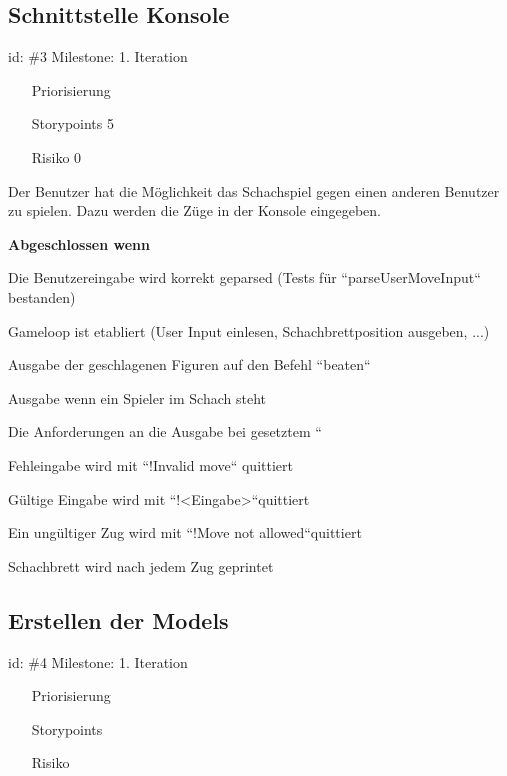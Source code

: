 
\subsection*{Schnittstelle Konsole}
id: \#3 Milestone: 1. Iteration\\

\begin{itemize}
\item[Priorisierung] 
\item[Storypoints] 5
\item[Risiko] 0
\end{itemize}

Der Benutzer hat die Möglichkeit das Schachspiel gegen einen anderen Benutzer zu spielen. Dazu werden die Züge in der Konsole eingegeben.

\textbf{Abgeschlossen wenn}
\begin{todolist}
    \item  Die Benutzereingabe wird korrekt geparsed (Tests für ``parseUserMoveInput`` bestanden)
  \item  Gameloop ist etabliert (User Input einlesen, Schachbrettposition ausgeben, ...)
  \item  Ausgabe der geschlagenen Figuren auf den Befehl ``beaten``
  \item  Ausgabe wenn ein Spieler im Schach steht
  \item  Die Anforderungen an die Ausgabe bei gesetztem ``
  \item  Fehleingabe wird mit ``!Invalid move`` quittiert
  \item  Gültige Eingabe wird mit ``!<Eingabe>``quittiert
  \item  Ein ungültiger Zug wird mit ``!Move not allowed``quittiert
  \item  Schachbrett wird nach jedem Zug geprintet

\end{todolist}

\subsection*{Erstellen der Models}
id: \#4 Milestone: 1. Iteration\\

\begin{itemize}
\item[Priorisierung] 
\item[Storypoints] 
\item[Risiko] 
\end{itemize}

